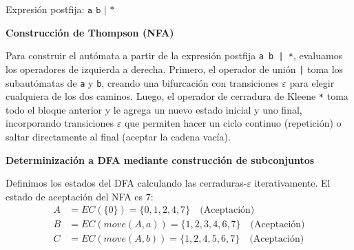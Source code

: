 \documentclass[12pt, letterpaper]{article}
\begin{document}
\begin{enumerate}
\begin{enumerate}
      Expresión postfija: $\boxed{\texttt{a b | *}}$

      \textbf{Construcción de Thompson (NFA)}

      Para construir el autómata a partir de la expresión postfija \texttt{a b | *}, evaluamos los operadores de izquierda a derecha. Primero, el operador de unión \texttt{|} toma los subautómatas de \texttt{a} y \texttt{b}, creando una bifurcación con transiciones $\varepsilon$ para elegir cualquiera de los dos caminos. Luego, el operador de cerradura de Kleene \texttt{*} toma todo el bloque anterior y le agrega un nuevo estado inicial y uno final, incorporando transiciones $\varepsilon$ que permiten hacer un ciclo continuo (repetición) o saltar directamente al final (aceptar la cadena vacía).

      \begin{center}
      \end{center}

      \textbf{Determinización a DFA mediante construcción de subconjuntos}

      Definimos los estados del DFA calculando las cerraduras-$\varepsilon$ iterativamente. El estado de aceptación del NFA es $7$:
      \begin{align*}
        A &= EC(\{0\}) = \{0,1,2,4,7\} \quad \text{(Aceptación)}\\
        B &= EC(move(A, a)) = \{1,2,3,4,6,7\} \quad \text{(Aceptación)}\\
        C &= EC(move(A, b)) = \{1,2,4,5,6,7\} \quad \text{(Aceptación)}
      \end{align*}


\end{enumerate}
\end{enumerate}
\end{document}
